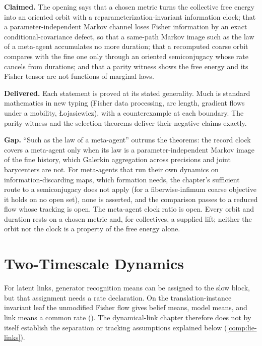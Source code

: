 \begin{verdictbox}{\NARROWER}
\textbf{Claimed.} The opening says that a chosen metric turns the collective free energy into an
oriented orbit with a reparameterization-invariant information clock; that a parameter-independent
Markov channel loses Fisher information by an exact conditional-covariance defect, so that a
same-path Markov image such as the law of a meta-agent accumulates no more duration; that a recomputed
coarse orbit compares with the fine one only through an oriented semiconjugacy whose rate cancels from
durations; and that a parity witness shows the free energy and its Fisher tensor are not functions of
marginal laws.

\textbf{Delivered.} Each statement is proved at its stated generality. Much is standard mathematics in
new typing (Fisher data processing, arc length, gradient flows under a mobility, {\L}ojasiewicz),
with a counterexample at each boundary. The parity witness and the selection theorems deliver their
negative claims exactly.

\textbf{Gap.} ``Such as the law of a meta-agent'' outruns the theorems: the record clock covers a
meta-agent only when its law is a parameter-independent Markov image of the fine history, which
Galerkin aggregation across precisions and joint barycenters are not. For meta-agents that run their
own dynamics on information-discarding maps, which formation needs, the chapter's sufficient route to
a semiconjugacy does not apply (for a fiberwise-infimum coarse objective it holds on no open set),
none is asserted, and the comparison passes to a reduced flow whose tracking is open. The meta-agent clock ratio is open. Every orbit and duration rests on a chosen
metric and, for collectives, a supplied lift; neither the orbit nor the clock is a property of the
free energy alone.
\end{verdictbox}

\chapter{Two-Timescale Dynamics}
\label{comp:ch08}

For latent links, generator recognition means can be assigned to the slow block, but that
assignment needs a rate declaration. On the translation-instance invariant leaf the unmodified
Fisher flow gives belief means, model means, and link means a common rate
(). The dynamical-link chapter therefore does not by itself
establish the separation or tracking assumptions explained below (\cref{comp:lie-links}).

